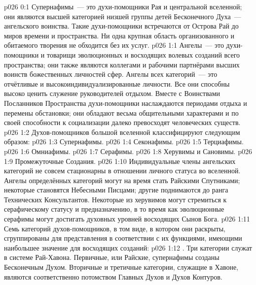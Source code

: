 \author{Совершенствователь Мудрости}
\vs p026 0:1 Супернафимы~--- это духи\hyp{}помощники Рая и центральной вселенной; они являются высшей категорией низшей группы детей Бесконечного Духа~--- ангельского воинства. Такие духи\hyp{}помощники встречаются от Острова Рай до миров времени и пространства. Ни одна крупная область организованного и обитаемого творения не обходится без их услуг.
\vs p026 1:1 Ангелы~--- это духи\hyp{}помощники и товарищи эволюционных и восходящих волевых созданий всего пространства; они также являются коллегами и рабочими партнёрами высших воинств божественных личностей сфер. Ангелы всех категорий~--- это отчётливые и высокоиндивидуализированные личности. Все они способны высоко ценить служение руководителей отдыхом. Вместе с Воинствами Посланников Пространства духи\hyp{}помощники наслаждаются периодами отдыха и перемены обстановки; они обладают весьма общительными характерами и по своей способности к социализации далеко превосходят человеческих существ.
\vs p026 1:2 \pc Духов\hyp{}помощников большой вселенной классифицируют следующим образом:
\vs p026 1:3 Супернафимы.
\vs p026 1:4 Секонафимы.
\vs p026 1:5 Терциафимы.
\vs p026 1:6 Омниафимы.
\vs p026 1:7 Серафимы.
\vs p026 1:8 Херувимы и Сановимы.
\vs p026 1:9 Промежуточные Создания.
\vs p026 1:10 \pc Индивидуальные члены ангельских категорий не совсем стационарны в отношении личного статуса во вселенной. Ангелы определённых категорий могут на время стать Райскими Спутниками; некоторые становятся Небесными Писцами; другие поднимаются до ранга Технических Консультантов. Некоторые из херувимов могут стремиться к серафическому статусу и предназначению, в то время как эволюционные серафимы могут достигать духовных уровней восходящих Сынов Бога.
\vs p026 1:11 \pc Семь категорий духов\hyp{}помощников, в том виде, в котором они раскрыты, сгруппированы для представления в соответствии с их функциями, имеющими наибольшее значение для восходящих созданий:
\vs p026 1:12 . Три категории  служат в системе Рай\hyp{}Хавона. Первичные, или Райские, супернафимы созданы Бесконечным Духом. Вторичные и третичные категории, служащие в Хавоне, являются соответственно потомством Главных Духов и Духов Контуров.
